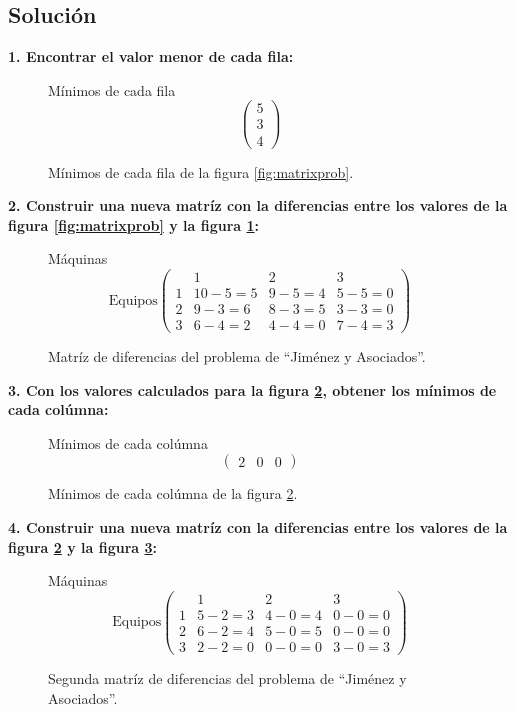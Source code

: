 \documentclass[letterpaper, 12pt]{article}
\begin{document}
    \subsection{Solución}
    \justify
    \textbf{1. Encontrar el valor menor de cada fila:}
    \begin{figure}[H]
        \centering
        Mínimos de cada fila
        \[\begin{pmatrix}
            5\\
            3\\
            4
        \end{pmatrix}\]
        \caption{Mínimos de cada fila de la figura \ref{fig:matrixprob}.}
        \label{fig:minsf}
    \end{figure}
    \justify
    \textbf{2. Construir una nueva matríz con la diferencias entre los valores de la figura \ref{fig:matrixprob} y la figura \ref{fig:minsf}:}
    \begin{figure}[H]
        \centering
        Máquinas
        \[\text{Equipos}\begin{pmatrix}
             &1&2&3\\
            1&10-5=5&9-5=4&5-5=0\\
            2&9-3=6&8-3=5&3-3=0\\
            3&6-4=2&4-4=0&7-4=3
        \end{pmatrix}\]
        \caption{Matríz de diferencias del problema de ``Jiménez y Asociados''.}
        \label{fig:matrixdif}
    \end{figure}
    \justify
    \textbf{3. Con los valores calculados para la figura \ref{fig:matrixdif}, obtener los mínimos de cada colúmna:}
    \begin{figure}[H]
        \centering
        Mínimos de cada colúmna
        \[\begin{pmatrix}
            2&0&0
        \end{pmatrix}\]
        \caption{Mínimos de cada colúmna de la figura \ref{fig:matrixdif}.}
        \label{fig:minsc}
    \end{figure}
    \justify
    \textbf{4. Construir una nueva matríz con la diferencias entre los valores de la figura \ref{fig:matrixdif} y la figura \ref{fig:minsc}:}
    \begin{figure}[H]
        \centering
        Máquinas
        \[\text{Equipos}\begin{pmatrix}
             &1&2&3\\
            1&5-2=3&4-0=4&0-0=0\\
            2&6-2=4&5-0=5&0-0=0\\
            3&2-2=0&0-0=0&3-0=3
        \end{pmatrix}\]
        \caption{Segunda matríz de diferencias del problema de ``Jiménez y Asociados''.}
        \label{fig:matrixdif1}
    \end{figure}
\end{document}
